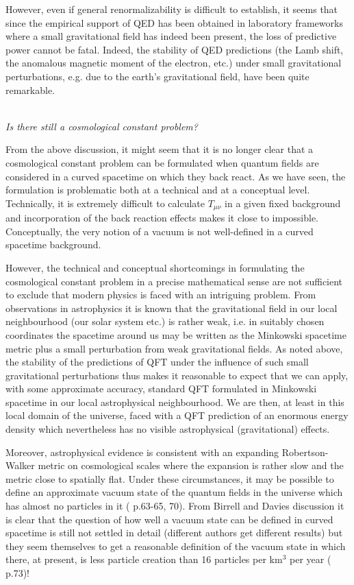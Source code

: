 \documentclass[12pt]{article}
\begin{document}
However, even if general renormalizability is difficult to
establish, it seems that since the empirical support of QED has
been obtained in laboratory frameworks where a small gravitational
field has indeed been present, the loss of predictive power cannot
be fatal. Indeed, the stability of QED predictions (the Lamb
shift, the anomalous magnetic moment of the electron, etc.) under
small gravitational perturbations, e.g. due to the earth's gravitational 
field, have been quite remarkable.

\ \\
{\em Is there still a cosmological constant problem?}

From the above discussion, it might seem that it is no longer clear
that a cosmological constant problem can be formulated
when quantum fields are considered in a curved spacetime on
which they back react. As we have seen, the formulation
is problematic both at a technical and at a conceptual
level. Technically, it is extremely difficult to calculate
$T_{\mu \nu}$ in a given fixed background and incorporation
of the back reaction effects makes it close to impossible. 
Conceptually, the very notion of a vacuum is not well-defined
in a curved spacetime background. 

However, the technical and conceptual shortcomings in formulating
the cosmological constant problem in a precise mathematical sense
are not sufficient to exclude that modern physics is faced with
an intriguing problem. From observations in astrophysics it is known
that the gravitational field in our local neighbourhood (our solar
system etc.) is rather weak, i.e. in suitably chosen coordinates
the spacetime around us may be written as the Minkowski spacetime
metric plus a small perturbation from weak gravitational fields.
As noted above, the stability of the predictions of QFT under the
influence of such small gravitational perturbations thus makes it
reasonable to expect that we can apply, with some approximate
accuracy, standard QFT formulated in Minkowski spacetime in our
local astrophysical neighbourhood. We are then, at least in this
local domain of the universe, faced with a QFT prediction of an
enormous energy density which nevertheless has no visible
astrophysical (gravitational) effects.

Moreover, astrophysical evidence is consistent with an expanding
Robertson-Walker metric on cosmological scales where the expansion
is rather slow and the metric close to spatially flat. Under these
circumstances, it may be possible to define an approximate vacuum
state of the quantum fields in the universe which has almost no
particles in it (\cite{birrell82} p.63-65, 70). From Birrell and
Davies discussion it is clear that the question of how well a
vacuum state can be defined in curved spacetime is still not
settled in detail (different authors get different results) but
they seem themselves to get a reasonable definition of the vacuum
state in which there, at present, is less particle creation than
16 particles per km$^3$ per year (\cite{birrell82} p.73)!
\end{document}

